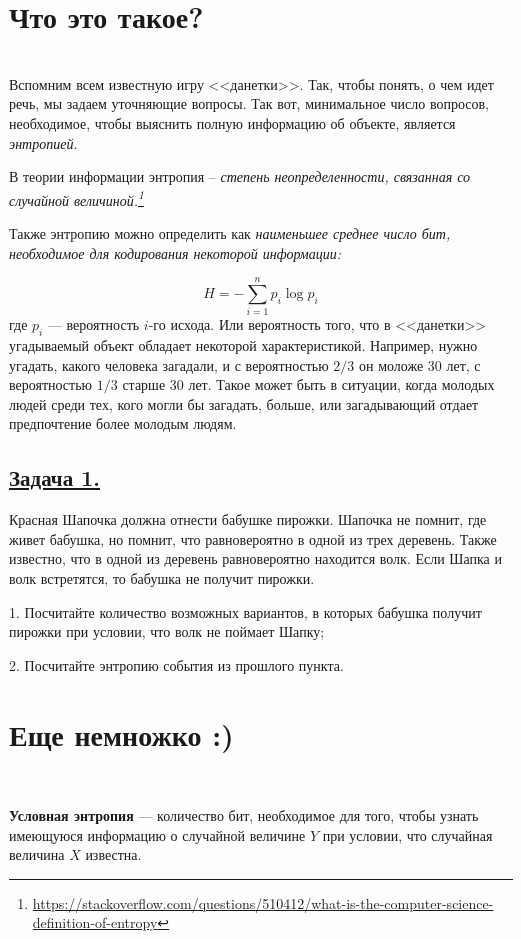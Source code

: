 \section*{Что это такое?}~\
\\ 

Вспомним всем известную игру <<данетки>>. Так, чтобы понять, о чем идет речь, мы задаем уточняющие вопросы. Так вот, минимальное число вопросов, необходимое, чтобы выяснить полную информацию об объекте, является \textit{энтропией}.

В теории информации энтропия -- \textit{степень неопределенности, связанная со случайной величиной.\footnote{\url{https://stackoverflow.com/questions/510412/what-is-the-computer-science-definition-of-entropy}}}

Также энтропию можно определить как \textit{наименьшее среднее число бит, необходимое для кодирования некоторой информации:}

\[H=-\sum\limits_{i=1}^n p_i\log p_i \]
где $p_i$ --- вероятность $i$-го исхода. Или вероятность того, что в <<данетки>> угадываемый объект обладает некоторой характеристикой. Например, нужно угадать, какого человека загадали, и с вероятностью $2/3$ он моложе 30 лет, с вероятностью $1/3$ старше 30 лет. Такое может быть в ситуации, когда молодых людей среди тех, кого могли бы загадать, больше, или загадывающий отдает предпочтение более молодым людям. 

\subsection*{\hyperref[sec:sol_problem1]{Задача 1.}}\label{sec:problem1} 
Красная Шапочка должна отнести бабушке пирожки. Шапочка не помнит, где живет бабушка, но помнит, что равновероятно в одной из трех деревень. Также известно, что в одной из деревень равновероятно находится волк. Если Шапка и волк встретятся, то бабушка не получит пирожки. 

1. Посчитайте количество возможных вариантов, в которых бабушка получит пирожки при условии, что волк не поймает Шапку; 

2. Посчитайте энтропию события из прошлого пункта. 

\section*{Еще немножко :)}~\
\\

\begin{siderules}
    \textbf{Условная энтропия} --- количество бит, необходимое для того, чтобы узнать имеющуюся информацию о случайной величине $Y$ при условии, что случайная величина $X$ известна.
\end{siderules}

